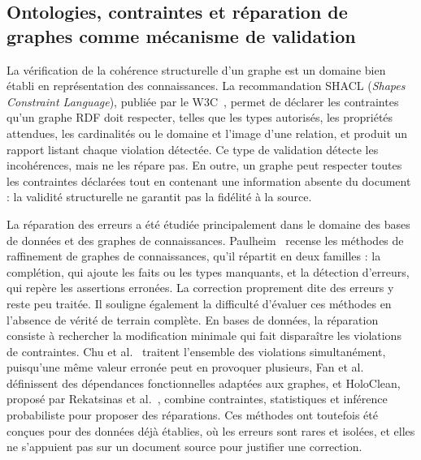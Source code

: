 \subsection{Ontologies, contraintes et réparation de graphes comme mécanisme de validation}

La vérification de la cohérence structurelle d'un graphe est un domaine bien établi en représentation des connaissances. La recommandation SHACL (\textit{Shapes Constraint Language}), publiée par le W3C~\cite{shacl2017}, permet de déclarer les contraintes qu'un graphe RDF doit respecter, telles que les types autorisés, les propriétés attendues, les cardinalités ou le domaine et l'image d'une relation, et produit un rapport listant chaque violation détectée. Ce type de validation détecte les incohérences, mais ne les répare pas. En outre, un graphe peut respecter toutes les contraintes déclarées tout en contenant une information absente du document : la validité structurelle ne garantit pas la fidélité à la source.

La réparation des erreurs a été étudiée principalement dans le domaine des bases de données et des graphes de connaissances. Paulheim~\cite{paulheim2017refinement} recense les méthodes de raffinement de graphes de connaissances, qu'il répartit en deux familles : la complétion, qui ajoute les faits ou les types manquants, et la détection d'erreurs, qui repère les assertions erronées. La correction proprement dite des erreurs y reste peu traitée. Il souligne également la difficulté d'évaluer ces méthodes en l'absence de vérité de terrain complète. En bases de données, la réparation consiste à rechercher la modification minimale qui fait disparaître les violations de contraintes. Chu et al.~\cite{chu2013holistic} traitent l'ensemble des violations simultanément, puisqu'une même valeur erronée peut en provoquer plusieurs, Fan et al.~\cite{fan2016gfd} définissent des dépendances fonctionnelles adaptées aux graphes, et HoloClean, proposé par Rekatsinas et al.~\cite{rekatsinas2017holoclean}, combine contraintes, statistiques et inférence probabiliste pour proposer des réparations. Ces méthodes ont toutefois été conçues pour des données déjà établies, où les erreurs sont rares et isolées, et elles ne s'appuient pas sur un document source pour justifier une correction.

